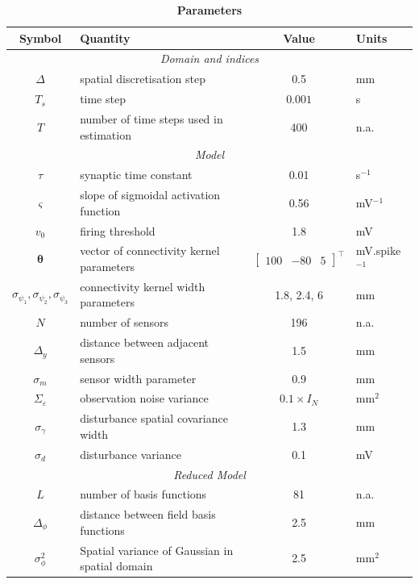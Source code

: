 \documentclass[12pt]{iopart}
\begin{document}
\begin{table}[!ht]
\caption{
\bf{Parameters}}
\begin{tabular}{|c|l|c|l|}
	\hline
	\textbf{Symbol} & \textbf{Quantity} & \textbf{Value} & \textbf{Units}\\
	\hline
	\multicolumn{4}{|c|}{\emph{Domain and indices}}\\
	\hline
	$\Delta$ & spatial discretisation step & 0.5 & mm \\
	$T_s$ & time step & $0.001$ & s\\
	$T$ & number of time steps used in estimation & 400 & n.a.\\
	\hline 
\multicolumn{4}{|c|}{\emph{Model}}\\
	\hline
	$\tau$ & synaptic time constant & 0.01 & s$^{-1}$ \\
	$\varsigma$ & slope of sigmoidal activation function & 0.56 & mV$^{-1}$\\
	$v_0$ & firing threshold & 1.8 & mV \\
	$\boldsymbol{\theta}$ & vector of connectivity kernel parameters & $\left[\begin{array}{ccc}
	100 &-80 &5
	\end{array}
	\right]^{\top}$ & mV.spike$^{-1}$\\
	$\sigma_{\psi_{1}}, \sigma_{\psi_{2}}, \sigma_{\psi_{3}}$ & connectivity kernel width parameters & 1.8, 2.4, 6 & mm\\
	$N$ & number of sensors & 196 & n.a.\\ 
	$\Delta_y$ & distance between adjacent sensors & 1.5 & mm\\
	$\sigma_{m}$ & sensor width parameter & 0.9 & mm \\
	$\Sigma_{\varepsilon}$ & observation noise variance & $0.1 \times I_{N}$ & mm$^2$ \\
	$\sigma_{\gamma}$& disturbance spatial covariance width & 1.3 & mm\\
	$\sigma_{d}$ & disturbance variance & 0.1 & mV \\
	\hline 
	\multicolumn{4}{|c|}{\emph{Reduced Model}}\\
	\hline
	$L$ & number of basis functions& 81 & n.a.\\
	$\Delta_{\phi}$ & distance between field basis functions & 2.5 & mm \\
	$\sigma^2_{\phi}$ & Spatial variance of Gaussian in spatial domain & 2.5 & mm$^2$\\
	\hline 

\end{tabular}
\end{table}
\end{document}
